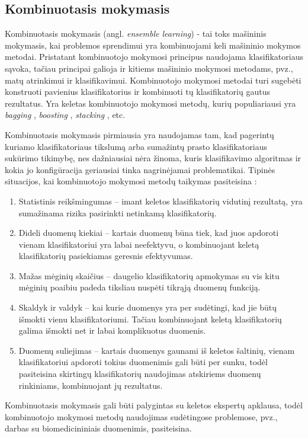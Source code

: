

\subsection{Kombinuotasis mokymasis}

Kombinuotasis mokymasis (angl. \textit{ensemble learning}) - tai toks mašininis mokymasis, kai problemos sprendimui yra kombinuojami keli mašininio mokymos metodai. Pristatant kombinuotojo mokymosi principus naudojama klasifikatoriaus sąvoka, tačiau principai galioja ir kitiems mašininio mokymosi metodams, pvz., matų atrinkimui ir klasifikavimui. Kombinuotojo mokymosi metodai turi sugebėti konstruoti pavienius klasifikatorius ir kombinuoti tų klasifikatorių gautus rezultatus. Yra keletas kombinuotojo mokymosi metodų, kurių populiariausi yra \textit{bagging} \cite{breiman1996bagging}, \textit{boosting} \cite{schapire2003boosting}, \textit{stacking} \cite{wolpert1992stacked}, etc.

Kombinuotasis mokymasis pirmiausia yra naudojamas tam, kad pagerintų kuriamo klasifikatoriaus tikslumą arba sumažintų prasto klasifikatoriaus sukūrimo tikimybę, nes dažniausiai nėra žinoma, kuris klasifikavimo algoritmas ir kokia jo konfigūracija geriausiai tinka nagrinėjamai problematikai. Tipinės situacijos, kai kombinuotojo mokymosi metodų taikymas pasiteisina \cite{polikar2006ensemble}:
\begin{enumerate}
 \item Statistinis reikšmingumas -- imant keletos klasifikatorių vidutinį rezultatą, yra sumažinama rizika pasirinkti netinkamą klasifikatorių.
 \item Dideli duomenų kiekiai -- kartais duomenų būna tiek, kad juos apdoroti vienam klasifikatoriui yra labai neefektyvu, o kombinuojant keletą klasifikatorių pasiekiamas geresnis efektyvumas.
 \item Mažas mėginių skaičius -- daugelio klasifikatorių apmokymas su vis kitu mėginių poaibiu padeda tiksliau nuspėti tikrąją duomenų funkciją.
 \item Skaldyk ir valdyk -- kai kurie duomenys yra per sudėtingi, kad jie būtų išmokti vienu klasifikatoriumi. Tačiau kombinuojant keletą klasifikatorių galima išmokti net ir labai komplikuotus duomenis. 
 \item Duomenų suliejimas -- kartais duomenys gaunami iš keletos šaltinių, vienam klasifikatoriui apdoroti tokius duomenimis gali būti per sunku, todėl pasiteisina skirtingų klasifikatorių naudojimas atskiriems duomenų rinkiniams, kombinuojant jų rezultatus.
\end{enumerate}
Kombinuotasis mokymasis gali būti palygintas su keletos ekspertų apklausa, todėl kombinuotojo mokymosi metodų naudojimas sudėtingose problemose, pvz., darbas su biomedicininiais duomenimis, pasiteisina.
